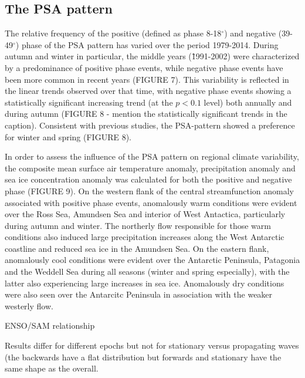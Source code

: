 \subsection{The PSA pattern}

The relative frequency of the positive (defined as phase 8-18$^{\circ}$) and negative (39-49$^{\circ}$) phase of the PSA pattern has varied over the period 1979-2014. During autumn and winter in particular, the middle years (\~1991-2002) were characterized by a predominance of positive phase events, while negative phase events have been more common in recent years (FIGURE 7). This variability is reflected in the linear trends observed over that time, with negative phase events showing a statistically significant increasing trend (at the $p < 0.1$ level) both annually and during autumn (FIGURE 8 - mention the statistically significant trends in the caption). Consistent with previous studies, the PSA-pattern showed a preference for winter and spring (FIGURE 8).

In order to assess the influence of the PSA pattern on regional climate variability, the composite mean surface air temperature anomaly, precipitation anomaly and sea ice concentration anomaly was calculated for both the positive and negative phase (FIGURE 9). On the western flank of the central streamfunction anomaly associated with positive phase events, anomalously warm conditions were evident over the Ross Sea, Amundsen Sea and interior of West Antactica, particularly during autumn and winter. The northerly flow responsible for those warm conditions also induced large precipitation increases along the West Antarctic coastline and reduced sea ice in the Amundsen Sea. On the eastern flank, anomalously cool conditions were evident over the Antarctic Peninsula, Patagonia and the Weddell Sea during all seasons (winter and spring especially), with the latter also experiencing large increases in sea ice. Anomalously dry conditions were also seen over the Antarcitc Peninsula in association with the weaker westerly flow. 


ENSO/SAM relationship

Results differ for different epochs but not for stationary versus propagating waves (the backwards have a flat distribution but forwards and stationary have the same shape as the overall.